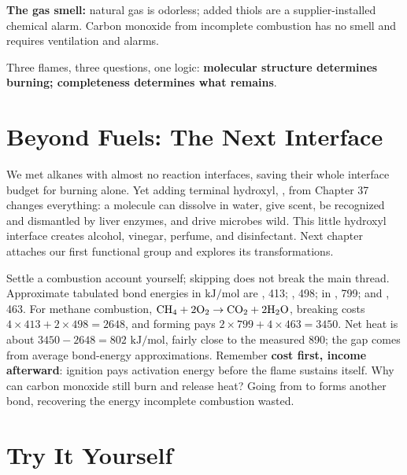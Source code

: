 \textbf{The gas smell:} natural gas is odorless; added thiols are a supplier-installed chemical alarm. Carbon monoxide from incomplete combustion has no smell and requires ventilation and alarms.

Three flames, three questions, one logic: \textbf{molecular structure determines burning; completeness determines what remains}.

\section{Beyond Fuels: The Next Interface}

We met alkanes with almost no reaction interfaces, saving their whole interface budget for burning alone. Yet adding terminal hydroxyl, , from Chapter 37 changes everything: a molecule can dissolve in water, give scent, be recognized and dismantled by liver enzymes, and drive microbes wild. This little hydroxyl interface creates alcohol, vinegar, perfume, and disinfectant. Next chapter attaches our first functional group and explores its transformations.

\begin{tiaozhan}
Settle a combustion account yourself; skipping does not break the main thread. Approximate tabulated bond energies in $\mathrm{kJ/mol}$ are , 413; , 498;  in , 799; and , 463. For methane combustion, $\mathrm{CH_4} + \mathrm{2O_2} \rightarrow \mathrm{CO_2} + \mathrm{2H_2O}$, breaking costs $4\times 413 + 2\times 498 = 2648$, and forming pays $2\times 799 + 4\times 463 = 3450$. Net heat is about $3450-2648=802$ $\mathrm{kJ/mol}$, fairly close to the measured 890; the gap comes from average bond-energy approximations. Remember \textbf{cost first, income afterward}: ignition pays activation energy before the flame sustains itself. Why can carbon monoxide still burn and release heat? Going from  to  forms another bond, recovering the energy incomplete combustion wasted.
\end{tiaozhan}

\section*{Try It Yourself}

